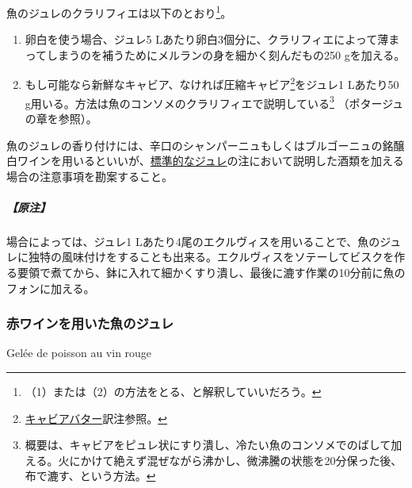 \begin{recette}
\begin{frsubenv}
\end{frsubenv}


魚のジュレのクラリフィエは以下のとおり\footnote{（1）または（2）の方法をとる、と解釈していいだろう。}。

\begin{enumerate}
\def\labelenumi{\arabic{enumi}.}
\item
  卵白を使う場合、ジュレ5
  Lあたり卵白3個分に、クラリフィエによって薄まってしまうのを補うためにメルランの身を細かく刻んだもの250
  gを加える。
\item
  もし可能なら新鮮なキャビア、なければ圧縮キャビア\footnote{\protect\hyperlink{beurre-de-caviar}{キャビアバター}訳注参照。}をジュレ1
  Lあたり50
  g用いる。方法は魚のコンソメのクラリフィエで説明している\footnote{概要は、キャビアをピュレ状にすり潰し、冷たい魚のコンソメでのばして加える。火にかけて絶えず混ぜながら沸かし、微沸騰の状態を20分保った後、布で漉す、という方法。}
  （ポタージュの章を参照）。
\end{enumerate}

魚のジュレの香り付けには、辛口のシャンパーニュもしくはブルゴーニュの銘醸白ワインを用いるといいが、\protect\hyperlink{gelees-ordinaires}{標準的なジュレ}の注において説明した酒類を加える場合の注意事項を勘案すること。

\hypertarget{nota-gelee-de-poisson-blanche}{%
\subparagraph{【原注】}\label{nota-gelee-de-poisson-blanche}}

場合によっては、ジュレ1
Lあたり4尾のエクルヴィスを用いることで、魚のジュレに独特の風味付けをすることも出来る。エクルヴィスをソテーしてビスクを作る要領で煮てから、鉢に入れて細かくすり潰し、最後に漉す作業の10分前に魚のフォンに加える。

\atoaki{}

\hypertarget{gelee-de-poisson-au-vin-rouge}{%
\subsubsection{赤ワインを用いた魚のジュレ}\label{gelee-de-poisson-au-vin-rouge}}

\begin{frsubenv}

Gelée de poisson au vin rouge

\end{frsubenv}


\end{recette}
